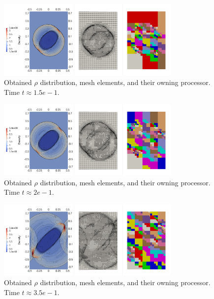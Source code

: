 \begin{figure}[H]
	\begin{center}
		\includegraphics[width=0.8\textwidth]{img/mhd-blast/new/adapt-full2.jpg}
	\caption{Obtained $\rho$ distribution, mesh elements, and their owning processor. Time $t\approx 1.5e-1$.}
	\label{figure:amrBlast3}
	\end{center}
\end{figure}
\vspace{-4mm}

\begin{figure}[H]
	\begin{center}
		\includegraphics[width=0.8\textwidth]{img/mhd-blast/new/adapt-full3.jpg}
	\caption{Obtained $\rho$ distribution, mesh elements, and their owning processor. Time $t\approx 2e-1$.}
	\label{figure:amrBlast4}
	\end{center}
\end{figure}
\vspace{-4mm}

\begin{figure}[H]
	\begin{center}
		\includegraphics[width=0.8\textwidth]{img/mhd-blast/new/adapt-full6.jpg}
	\caption{Obtained $\rho$ distribution, mesh elements, and their owning processor. Time $t\approx 3.5e-1$.}
	\label{figure:amrBlast5}
	\end{center}
\end{figure}
\vspace{-4mm}

